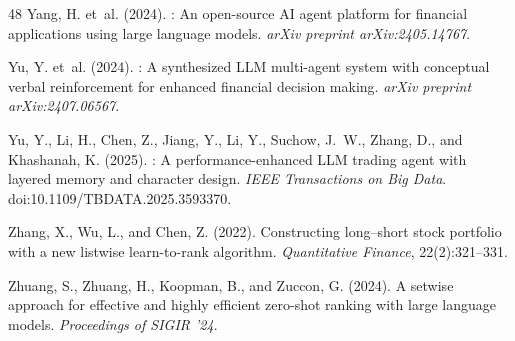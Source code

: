 {\begin{thebibliography}{48}
Yang, H. et~al. (2024).
: An open-source {AI} agent platform for financial applications using large language models.
\newblock \emph{arXiv preprint arXiv:2405.14767}.

Yu, Y. et~al. (2024).
: A synthesized {LLM} multi-agent system with conceptual verbal reinforcement for enhanced financial decision making.
\newblock \emph{arXiv preprint arXiv:2407.06567}.

Yu, Y., Li, H., Chen, Z., Jiang, Y., Li, Y., Suchow, J.~W., Zhang, D., and Khashanah, K. (2025).
: A performance-enhanced {LLM} trading agent with layered memory and character design.
\newblock \emph{IEEE Transactions on Big Data}. doi:10.1109/TBDATA.2025.3593370.

Zhang, X., Wu, L., and Chen, Z. (2022).
\newblock Constructing long--short stock portfolio with a new listwise learn-to-rank algorithm.
\newblock \emph{Quantitative Finance}, 22(2):321--331.

Zhuang, S., Zhuang, H., Koopman, B., and Zuccon, G. (2024).
\newblock A setwise approach for effective and highly efficient zero-shot ranking with large language models.
\newblock \emph{Proceedings of SIGIR '24}.

\end{thebibliography}
}

